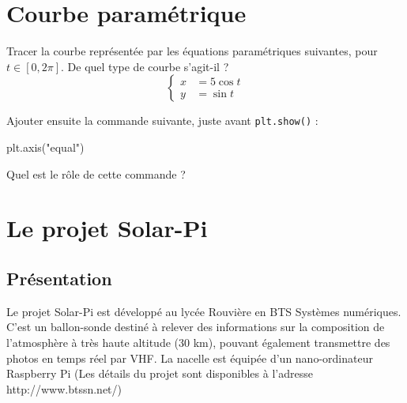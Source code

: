 \documentclass[10pt]{article}
\begin{document}


\section{Courbe paramétrique}

Tracer la courbe représentée par les équations paramétriques suivantes, pour $t \in [ 0,2 \pi ]$. De quel type de courbe s'agit-il ? 
\[
\left\lbrace
\begin{aligned}
x&=5 \cos t \\
y&=\sin t
\end{aligned}
\right.
\]

Ajouter ensuite la commande suivante, juste avant \texttt{plt.show()} :
\begin{py}
\begin{python}
plt.axis("equal")
\end{python}
\end{py}
Quel est le rôle de cette commande ?



\section{Le projet Solar-Pi}
\setcounter{subparagraph}{0}
\subsection{Présentation}

Le projet Solar-Pi est développé au lycée Rouvière en BTS Systèmes numériques. C'est un ballon-sonde destiné à relever des informations sur la composition de l'atmosphère à très haute altitude (30 km), pouvant également transmettre des photos en temps réel par VHF. La nacelle est équipée d'un nano-ordinateur Raspberry Pi (Les détails du projet sont disponibles à l'adresse http://www.btssn.net/)
\end{document}
